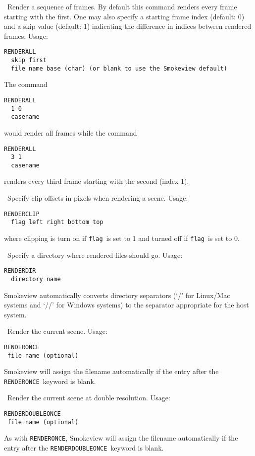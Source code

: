 \documentclass[11pt,twoside]{book}
\begin{document}
\ Render a sequence of frames.  By default this
command renders every frame starting with the first. One may also
specify a starting frame index (default: 0) and a skip value
(default: 1) indicating the difference in indices between rendered
frames. Usage:
\begin{lstlisting}
RENDERALL
  skip first
  file name base (char) (or blank to use the Smokeview default)
\end{lstlisting}

The command
\begin{lstlisting}
RENDERALL
  1 0
  casename
\end{lstlisting}
would render all frames while the command
\begin{lstlisting}
RENDERALL
  3 1
  casename
\end{lstlisting}
renders every third frame starting with the second (index 1).

\ Specify clip offsets in pixels when
rendering a scene.  Usage:
\begin{lstlisting}
RENDERCLIP
  flag left right bottom top
\end{lstlisting}
where clipping is turn on if {\tt flag}\ is set to 1 and
turned off if {\tt flag}\ is set to 0.

\ Specify a
directory where rendered files should go. Usage:
\begin{lstlisting}
RENDERDIR
  directory name
\end{lstlisting}
Smokeview automatically converts directory separators (`/' for Linux/Mac systems
and `//' for Windows systems) to the separator appropriate for the host system.

\ Render the current scene.
Usage:
\begin{lstlisting}
RENDERONCE
 file name (optional)
\end{lstlisting}
Smokeview will assign the filename automatically if the
entry after the {\tt RENDERONCE}\ keyword is blank.

\ Render the current scene at double resolution.
Usage:
\begin{lstlisting}
RENDERDOUBLEONCE
 file name (optional)
\end{lstlisting}
As with {\tt RENDERONCE}, Smokeview will assign the filename
automatically if the entry after the {\tt RENDERDOUBLEONCE}\ keyword is blank.
\end{document}
